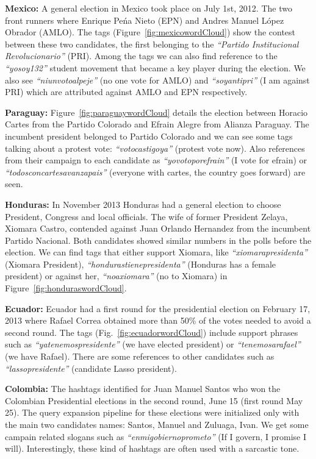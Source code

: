 \noindent	
{\bf Mexico:} A general election in Mexico took place on July 1st, 2012.
The two front runners where Enrique Pe\'{n}a Nieto (EPN) and Andres Manuel L\'{o}pez Obrador (AMLO).
The tags (Figure~\ref{fig:mexicowordCloud}) show the contest between these two candidates, the first belonging to the \emph{“Partido Institucional Revolucionario”} (PRI). 
Among the tags we can also find reference to the \emph{“yosoy132”} student movement that became a key player during the election. 
We also see \emph{“niunvotoalpeje”} (no one vote for AMLO) and \emph{“soyantipri”} (I am against PRI) which are attributed against AMLO and EPN respectively.

\noindent
{\bf Paraguay:}
Figure~\ref{fig:paraguaywordCloud} details the election between Horacio Cartes from the Partido Colorado and Efrain Alegre from Alianza Paraguay. 
The incumbent president belonged to Partido Colorado and we can see some tags talking about a protest vote: \emph{“votocastigoya”} (protest vote now). 
Also references from their campaign to each candidate as \emph{“yovotoporefrain”} (I vote for efrain) or \emph{“todosconcartesavanzapais”} (everyone with cartes, the country goes forward) are seen.

\noindent
{\bf Honduras:}
In November 2013 Honduras had a general election to choose President, Congress and local officials. 
The wife of former President Zelaya, Xiomara Castro, contended against Juan Orlando Hernandez from the incumbent Partido Nacional. 
Both candidates showed similar numbers in the polls before the election. 
We can find tags that either support Xiomara, like \emph{“xiomarapresidenta”} (Xiomara President), \emph{“hondurastienepresidenta”} (Honduras has a female president) or against her, \emph{“noaxiomara”} (no to Xiomara) in Figure~\ref{fig:honduraswordCloud}.

\noindent
{\bf Ecuador:}
Ecuador had a first round for the presidential election on February 17, 2013 where Rafael Correa obtained more than 50\% of the votes needed to avoid a second round. 
The tags (Fig.~\ref{fig:ecuadorwordCloud}) include support phrases such as \emph{“yatenemospresidente”} (we have elected president) or \emph{“tenemosarafael”} (we have Rafael). 
There are some references to other candidates such as \emph{“lassopresidente”} (candidate Lasso president).

\noindent
{\bf Colombia:}
The hashtags identified for Juan Manuel Santos who won the Colombian Presidential elections in the second round,
June 15 (first round May 25). The query expansion pipeline for these elections were initialized only with the main two candidates names: Santos, Manuel and Zuluaga, Ivan. We get some campain related slogans such as \emph{``enmigobiernoprometo''} (If I govern, I promise I will). Interestingly, these kind of hashtags are often used with a sarcastic tone.

